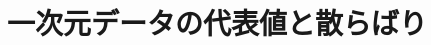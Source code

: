 \documentclass[../../topic_statistics]{subfiles}
\begin{document}
\chapter{一次元データの代表値と散らばり}





\end{document}
